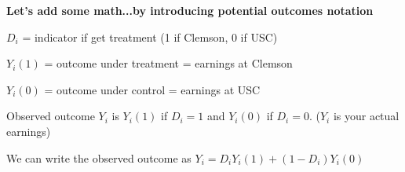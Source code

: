 \documentclass[11pt, aspectratio=169]{beamer}
\newenvironment{wideitemize}{\itemize\addtolength{\itemsep}{5pt}}{\enditemize}
\begin{document}

\begin{frame}{\bf \large Let's add some math...by introducing \textbf{potential outcomes} notation}
	\begin{wideitemize}
		
		\item $D_i$ = indicator if get treatment (1 if Clemson, 0 if USC)
		
		
		\item $Y_i(1)$ = outcome under treatment = earnings at Clemson
		\item $Y_i(0)$ = outcome under control = earnings at USC
		
		\vspace{10mm}
		
		\item Observed outcome $Y_i$ is $Y_i(1)$ if $D_i = 1$ and $Y_i(0)$ if $D_i = 0$. ($Y_i$ is your actual earnings)
		
		\item
		We can write the observed outcome as $Y_i = D_i Y_i(1) + (1-D_i) Y_i(0)$
	\end{wideitemize}
	
\end{frame}
\end{document}
